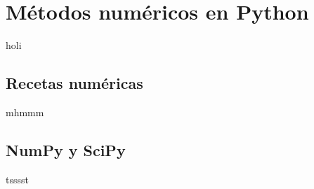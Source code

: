 \chapter{Métodos numéricos en Python}

holi

\section{Recetas numéricas}

mhmmm

\section{NumPy y SciPy}

tsssst
